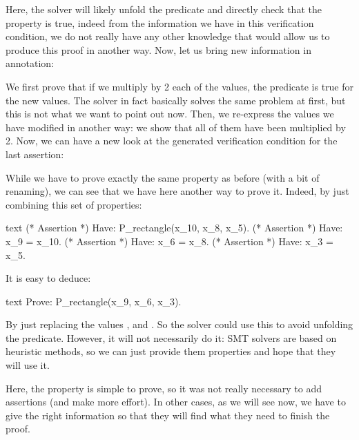 


Here, the solver will likely unfold the predicate and directly check that the
property is true, indeed from the information we have in this verification
condition, we do not really have any other knowledge that would allow us to
produce this proof in another way. Now, let us bring new information in
annotation:






We first prove that if we multiply by 2 each of the values, the predicate
is true for the new values. The solver in fact basically solves the same
problem at first, but this is not what we want to point out now. Then, we
re-express the values we have modified in another way: we show that all of them
have been multiplied by 2. Now, we can have a new look at the generated
verification condition for the last assertion:






While we have to prove exactly the same property as before (with a bit of
renaming), we can see that we have here another way to prove it. Indeed, by
just combining this set of properties:


\begin{CodeBlock}{text}
(* Assertion *)
Have: P_rectangle(x_10, x_8, x_5).
(* Assertion *)
Have: x_9 = x_10.
(* Assertion *)
Have: x_6 = x_8.
(* Assertion *)
Have: x_3 = x_5.
\end{CodeBlock}


It is easy to deduce:


\begin{CodeBlock}{text}
Prove: P_rectangle(x_9, x_6, x_3).
\end{CodeBlock}


By just replacing the values ,  and
. So the solver could use this to avoid unfolding the
predicate. However, it will not necessarily do it: SMT solvers are based on
heuristic methods, so we can just provide them properties and hope that they
will use it.



Here, the property is simple to prove, so it was not really necessary to add
assertions (and make more effort). In other cases, as we will see now, we have
to give the right information so that they will find what they need to finish
the proof.



